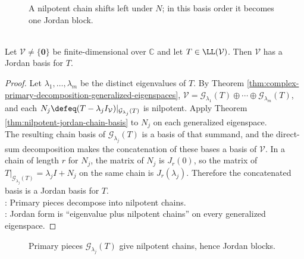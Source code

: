 \begin{figure}[H]
  \centering
  
  \caption{A nilpotent chain shifts left under $N$; in this basis order it becomes one Jordan block.}
  \label{fig:jordan-chain-nilpotent-basis}
\end{figure}

\begin{theorem} \label{thm:complex-jordan-form} \\
Let $\mathcal{V}\neq\{\mathbf{0}\}$ be finite-dimensional over $\mathbb{C}$ and let $T\in\LL(\mathcal{V})$. Then $\mathcal{V}$ has a Jordan basis for $T$.
\begin{proof}
Let $\lambda_1,\ldots,\lambda_m$ be the distinct eigenvalues of $T$. By Theorem \ref{thm:complex-primary-decomposition-generalized-eigenspaces}, $\mathcal{V}=\mathcal{G}_{\lambda_1}(T)\oplus\cdots\oplus \mathcal{G}_{\lambda_m}(T)$, and each $N_j\defeq(T-\lambda_jI_{\mathcal{V}})|_{\mathcal{G}_{\lambda_j}(T)}$ is nilpotent. Apply Theorem \ref{thm:nilpotent-jordan-chain-basis} to $N_j$ on each generalized eigenspace.\\
The resulting chain basis of $\mathcal{G}_{\lambda_j}(T)$ is a basis of that summand, and the direct-sum decomposition makes the concatenation of these bases a basis of $\mathcal{V}$. In a chain of length $r$ for $N_j$, the matrix of $N_j$ is $J_r(0)$, so the matrix of $T|_{\mathcal{G}_{\lambda_j}(T)}=\lambda_jI+N_j$ on the same chain is $J_r(\lambda_j)$. Therefore the concatenated basis is a Jordan basis for $T$.\\
: Primary pieces decompose into nilpotent chains.\\
: Jordan form is ``eigenvalue plus nilpotent chains'' on every generalized eigenspace.
\end{proof}
\end{theorem}

\begin{figure}[H]
  \centering
  
  \caption{Primary pieces $\mathcal{G}_{\lambda_j}(T)$ give nilpotent chains, hence Jordan blocks.}
  \label{fig:jordan-form-primary-chains}
\end{figure}

